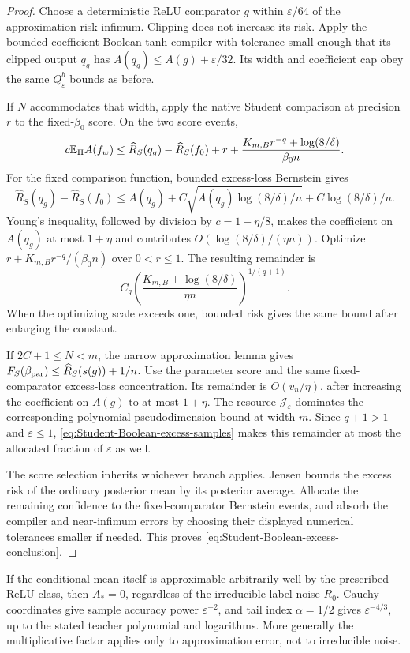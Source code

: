 \begin{proof}
Choose a deterministic ReLU comparator $g$ within $\varepsilon/64$ of the approximation-risk infimum. Clipping does not increase its risk. Apply the bounded-coefficient Boolean tanh compiler with tolerance small enough that its clipped output $q_g$ has
$A(q_g)\le A(g)+\varepsilon/32$. Its width and coefficient cap obey the same $Q_\varepsilon^b$ bounds as before.

If $N$ accommodates that width, apply the native Student comparison at precision $r$ to the fixed-$\beta_0$ score. On the two score events,
\[
 c\mathbb E_\Pi A(f_w)\le
 \widehat R_S(q_g)-\widehat R_S(f_0)
       +r+\frac{K_{m,B}r^{-q}+\log(8/\delta)}{\beta_0n}.
\]
For the fixed comparison function, bounded excess-loss Bernstein gives
\[
 \widehat R_S(q_g)-\widehat R_S(f_0)
 \le A(q_g)+C\sqrt{A(q_g)\log(8/\delta)/n}
                       +C\log(8/\delta)/n.
\]
Young's inequality, followed by division by $c=1-\eta/8$, makes the coefficient on $A(q_g)$ at most $1+\eta$ and contributes
$O(\log(8/\delta)/(\eta n))$. Optimize
$r+K_{m,B}r^{-q}/(\beta_0n)$ over $0<r\le1$.
The resulting remainder is
\[
 C_q\left(\frac{K_{m,B}+\log(8/\delta)}{\eta n}\right)^{1/(q+1)}.
\]
When the optimizing scale exceeds one, bounded risk gives the same bound after enlarging the constant.

If $2C+1\le N<m$, the narrow approximation lemma gives
$F_S(\beta_{\rm par})\le\widehat R_S(s(g))+1/n$.
Use the parameter score and the same fixed-comparator excess-loss concentration. Its remainder is $O(v_n/\eta)$, after increasing the coefficient on $A(g)$ to at most $1+\eta$. The resource $\mathcal J_\varepsilon$ dominates the corresponding polynomial pseudodimension bound at width $m$. Since $q+1>1$ and $\varepsilon\le1$, \eqref{eq:Student-Boolean-excess-samples} makes this remainder at most the allocated fraction of $\varepsilon$ as well.

The score selection inherits whichever branch applies. Jensen bounds the excess risk of the ordinary posterior mean by its posterior average. Allocate the remaining confidence to the fixed-comparator Bernstein events, and absorb the compiler and near-infimum errors by choosing their displayed numerical tolerances smaller if needed. This proves \eqref{eq:Student-Boolean-excess-conclusion}.
\end{proof}

If the conditional mean itself is approximable arbitrarily well by the prescribed ReLU class, then $A_*=0$, regardless of the irreducible label noise $R_0$. Cauchy coordinates give sample accuracy power $\varepsilon^{-2}$, and tail index $\alpha=1/2$ gives $\varepsilon^{-4/3}$, up to the stated teacher polynomial and logarithms. More generally the multiplicative factor applies only to approximation error, not to irreducible noise.

